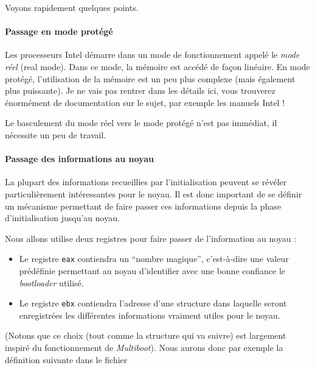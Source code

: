    Voyons rapidement quelques points.

\paragraph{Passage en mode protégé}

   Les processeurs Intel démarre dans un mode de fonctionnement appelé
le {\em mode réel} (real mode). Dans ce mode, la mémoire est accédé de
façon linéaire. En mode protégé, l'utilisation de la mémoire est un
peu plus complexe (mais également plus puissante). Je ne vais pas
rentrer dans les détails ici, vous trouverez énormément de
documentation sur le sujet, par exemple les manuels Intel !

   Le basculement du mode réel vers le mode protégé n'est pas
immédiat, il nécessite un peu de travail.
   
\paragraph{Passage des informations au noyau}

   La plupart des informations recueillies par l'initialisation peuvent se
révéler particulièrement intéressantes pour le noyau. Il est donc important de
se définir un mécanisme permettant de faire passer ces informations depuis la
phase d'initialisation jusqu'au noyau.

   Nous allons utilise deux registres pour faire passer de
l'information au noyau :

\begin{itemize}
   \item Le registre \lstinline!eax! contiendra un ``nombre magique'',
     c'est-à-dire une valeur prédéfinie permettant au noyau
     d'identifier avec une bonne confiance le {\em bootloader}
     utilisé.
   \item Le registre \lstinline!ebx! contiendra l'adresse d'une
     structure dans laquelle seront enregistrées les différentes
     informations vraiment utiles pour le noyau.
\end{itemize}

   (Notons que ce choix (tout comme la structure qui va suivre) est
largement inspiré du fonctionnement de {\em Multiboot}). Nous aurons
donc par exemple la définition suivante dans le fichier

